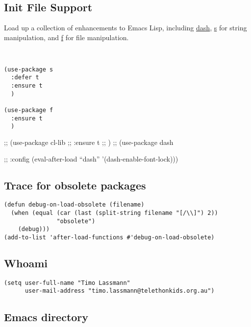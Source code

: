 \documentclass[12pt]{article}
\begin{document}
\subsection{Init File Support}
\label{sec:org6b7bf1f}

Load up a collection of enhancements to Emacs Lisp, including \href{https://github.com/magnars/dash.el}{dash},
\href{https://github.com/magnars/s.el}{s} for string manipulation, and \href{https://github.com/rejeep/f.el}{f} for file manipulation.

\begin{verbatim}


(use-package s
  :defer t
  :ensure t
  )

(use-package f
  :ensure t
  )
\end{verbatim}

;; (use-package cl-lib
;;   :ensure t
;;   )
;; (use-package dash

;;   :config (eval-after-load ``dash'' '(dash-enable-font-lock)))

\subsection{Trace for obsolete packages}
\label{sec:org6a3fb93}

\begin{verbatim}
(defun debug-on-load-obsolete (filename)
  (when (equal (car (last (split-string filename "[/\\]") 2))
               "obsolete")
    (debug)))
(add-to-list 'after-load-functions #'debug-on-load-obsolete)
\end{verbatim}

\subsection{Whoami}
\label{sec:orgbb9175c}

\begin{verbatim}
(setq user-full-name "Timo Lassmann"
      user-mail-address "timo.lassmann@telethonkids.org.au")
\end{verbatim}

\subsection{Emacs directory}
\label{sec:org9aefe85}
\end{document}
